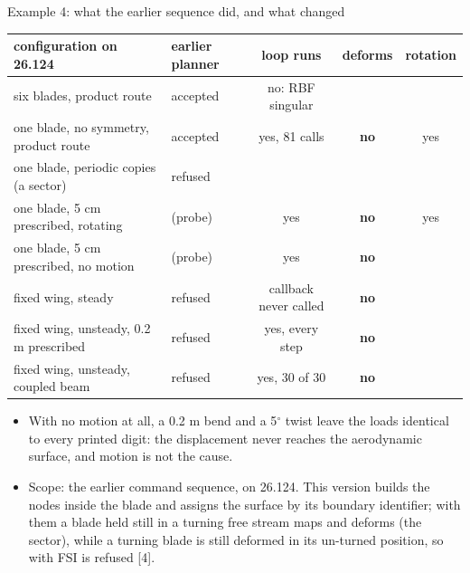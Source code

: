 \begin{frame}{Example 4: what the earlier sequence did, and what changed}
\relax %
{\ftstablesize\renewcommand{\arraystretch}{1.08}
\begin{tabular*}{\linewidth}{@{\extracolsep{\fill}}llccc@{}}
\toprule
configuration on 26.124 & earlier planner & loop runs & deforms & rotation \\
\midrule
six blades, product route & accepted & no: RBF singular & & \\
one blade, no symmetry, product route & accepted & yes, 81 calls & \textbf{no} & yes \\
one blade, periodic copies (a sector) & refused & & & \\
one blade, 5 cm prescribed, rotating & (probe) & yes & \textbf{no} & yes \\
one blade, 5 cm prescribed, no motion & (probe) & yes & \textbf{no} & \\
fixed wing, steady & refused & callback never called & \textbf{no} & \\
fixed wing, unsteady, 0.2 m prescribed & refused & yes, every step & \textbf{no} & \\
fixed wing, unsteady, coupled beam & refused & yes, 30 of 30 & \textbf{no} & \\
\bottomrule
\end{tabular*}}
\par\vspace{2mm}
\begin{itemize}\scriptsize
  \item With no motion at all, a 0.2 m bend and a 5\(^\circ\) twist leave the loads
        identical to every printed digit: the displacement never reaches the
        aerodynamic surface, and motion is not the cause.
  \item Scope: the earlier command sequence, on 26.124. This version builds the
        nodes inside the blade and assigns the surface by its boundary
        identifier; with them a blade held still in a turning free stream maps
        and deforms (the  sector), while a turning blade
        is still deformed in its un-turned position, so 
        with FSI is refused [4].
\end{itemize}
\end{frame}

